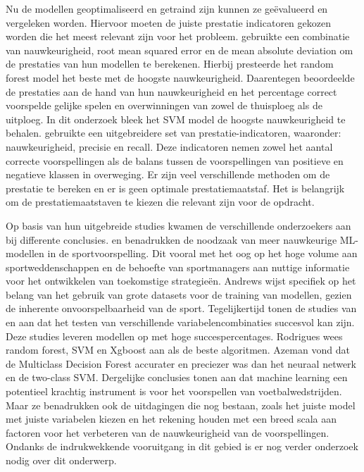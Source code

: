 Nu de modellen geoptimaliseerd en getraind zijn kunnen ze geëvalueerd en vergeleken worden. Hiervoor moeten de juiste prestatie indicatoren gekozen worden die het meest relevant zijn voor het probleem.
\textcite{Stuebinger2019} gebruikte een combinatie van nauwkeurigheid, root mean squared error en de mean absolute deviation om de prestaties van hun modellen te berekenen. Hierbij presteerde het random forest model het beste met de hoogste nauwkeurigheid.
Daarentegen beoordeelde \textcite{Rodrigues2022} de prestaties aan de hand van hun nauwkeurigheid en het percentage correct voorspelde gelijke spelen en overwinningen van zowel de thuisploeg als de uitploeg. In dit onderzoek bleek het SVM model de hoogste nauwkeurigheid te behalen.
\textcite{Azeman2020} gebruikte een uitgebreidere set van prestatie-indicatoren, waaronder: nauwkeurigheid, precisie en recall. Deze indicatoren nemen zowel het aantal correcte voorspellingen als de balans tussen de voorspellingen van positieve en negatieve klassen in overweging.
Er zijn veel verschillende methoden om de prestatie te bereken en er is geen optimale prestatiemaatstaf. Het is belangrijk om de prestatiemaatstaven te kiezen die relevant zijn voor de opdracht.

Op basis van hun uitgebreide studies kwamen de verschillende onderzoekers aan bij differente conclusies.
\textcite{Bunker2019} en \textcite{KevinAndrews2021} benadrukken de noodzaak van meer nauwkeurige ML-modellen in de sportvoorspelling. Dit vooral met het oog op het hoge volume aan sportweddenschappen en de behoefte van sportmanagers aan nuttige informatie voor het ontwikkelen van toekomstige strategieën. Andrews wijst specifiek op het belang van het gebruik van grote datasets voor de training van modellen, gezien de inherente onvoorspelbaarheid van de sport.
Tegelijkertijd tonen de studies van \textcite{Rodrigues2022} en \textcite{Azeman2020} aan dat het testen van verschillende variabelencombinaties succesvol kan zijn. Deze studies leveren modellen op met hoge succespercentages. Rodrigues wees random forest, SVM en Xgboost aan als de beste algoritmen. Azeman vond dat de Multiclass Decision Forest accurater en preciezer was dan het neuraal netwerk en de two-class SVM.
Dergelijke conclusies tonen aan dat machine learning een potentieel krachtig instrument is voor het voorspellen van voetbalwedstrijden. Maar ze benadrukken ook de uitdagingen die nog bestaan, zoals het juiste model met juiste variabelen kiezen en het rekening houden met een breed scala aan factoren voor het verbeteren van de nauwkeurigheid van de voorspellingen. Ondanks de indrukwekkende vooruitgang in dit gebied is er nog verder onderzoek nodig over dit onderwerp.

